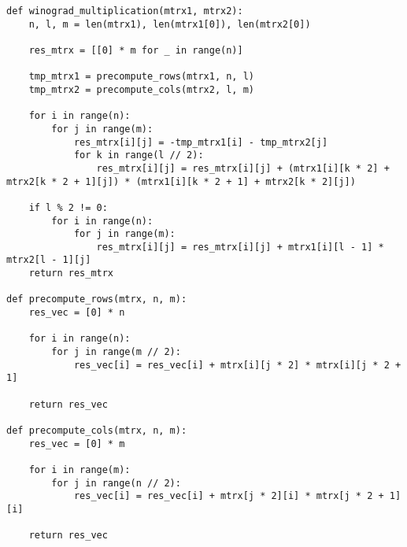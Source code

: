 \begin{center}
\captionsetup{justification=raggedright,singlelinecheck=off}
\begin{lstlisting}[label=lst:winograd,caption=Алгоритм Винограда]
def winograd_multiplication(mtrx1, mtrx2):
	n, l, m = len(mtrx1), len(mtrx1[0]), len(mtrx2[0])
	
	res_mtrx = [[0] * m for _ in range(n)]
	
	tmp_mtrx1 = precompute_rows(mtrx1, n, l)
	tmp_mtrx2 = precompute_cols(mtrx2, l, m)
	
	for i in range(n):
		for j in range(m):
			res_mtrx[i][j] = -tmp_mtrx1[i] - tmp_mtrx2[j]
			for k in range(l // 2):
				res_mtrx[i][j] = res_mtrx[i][j] + (mtrx1[i][k * 2] + mtrx2[k * 2 + 1][j]) * (mtrx1[i][k * 2 + 1] + mtrx2[k * 2][j])
	
	if l % 2 != 0:
		for i in range(n):
			for j in range(m):
				res_mtrx[i][j] = res_mtrx[i][j] + mtrx1[i][l - 1] * mtrx2[l - 1][j]
	return res_mtrx

def precompute_rows(mtrx, n, m):
	res_vec = [0] * n
	
	for i in range(n):
		for j in range(m // 2):
			res_vec[i] = res_vec[i] + mtrx[i][j * 2] * mtrx[i][j * 2 + 1]
	
	return res_vec

def precompute_cols(mtrx, n, m):
	res_vec = [0] * m
	
	for i in range(m):
		for j in range(n // 2):
			res_vec[i] = res_vec[i] + mtrx[j * 2][i] * mtrx[j * 2 + 1][i]
	
	return res_vec
    
\end{lstlisting}
\end{center}

